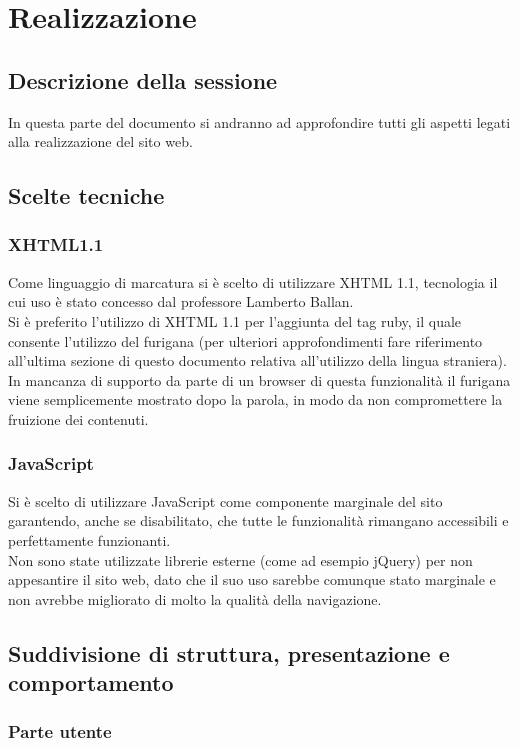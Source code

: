 \documentclass[openany, a4paper, 12pt]{report}
\begin{document}
	\chapter{Realizzazione}
	\section{Descrizione della sessione}
	In questa parte del documento si andranno ad approfondire tutti gli aspetti legati alla realizzazione del sito web.

	\section{Scelte tecniche}
	\subsection{XHTML1.1}
	Come linguaggio di marcatura si è scelto di utilizzare XHTML 1.1, tecnologia il cui uso è stato concesso dal professore Lamberto Ballan.\\
	Si è preferito l'utilizzo di XHTML 1.1 per l'aggiunta del tag ruby, il quale consente l'utilizzo del furigana (per ulteriori approfondimenti fare riferimento all'ultima sezione di questo documento relativa all'utilizzo della lingua straniera).\\
	In mancanza di supporto da parte di un browser di questa funzionalità il furigana viene semplicemente mostrato dopo la parola, in modo da non compromettere la fruizione dei contenuti.

	\subsection{JavaScript}
	Si è scelto di utilizzare JavaScript come componente marginale del sito garantendo, anche se disabilitato, che tutte le funzionalità rimangano accessibili e perfettamente funzionanti.\\
	Non sono state utilizzate librerie esterne (come ad esempio jQuery) per non appesantire il sito web, dato che il suo uso sarebbe comunque stato marginale e non avrebbe migliorato di molto la qualità della navigazione.

	\section{Suddivisione di struttura, presentazione e comportamento}
		\subsection{Parte utente}
\end{document}
